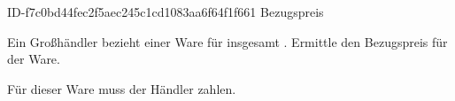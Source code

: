 \begin{exercise}
      {ID-f7c0bd44fec2f5aec245c1cd1083aa6f64f1f661}
      {Bezugspreis}
  \ifproblem\problem\par
    Ein Großhändler bezieht  einer Ware für insgesamt .
    Ermittle den Bezugspreis für  der Ware.
  \fi
  \ifoutcome\outcome\par
    Für  dieser Ware muss der Händler  zahlen.
  \fi
\end{exercise}
